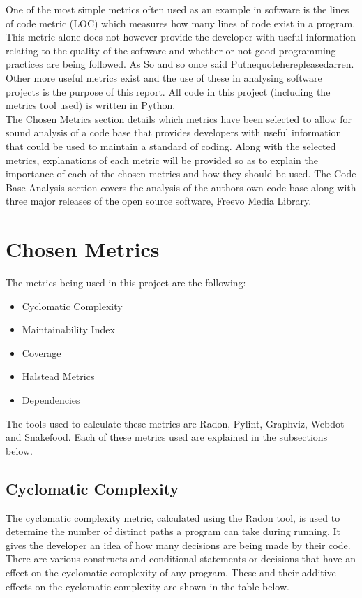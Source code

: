 \documentclass[11pt,journal, a4paper]{IEEEtran}
\begin{document}
\noindent
One of the most simple metrics often used as an example in software is the lines of code metric (LOC) which measures how many lines of code exist in a program. This metric alone does not however provide the developer with useful information relating to the quality of the software and whether or not good programming practices are being followed. As So and so once said Puthequoteherepleasedarren. Other more useful metrics exist and the use of these in analysing software projects is the purpose of this report. All code in this project (including the metrics tool used) is written in Python.  \\

\noindent
The Chosen Metrics section details which metrics have been selected to allow for sound analysis of a code base that provides developers with useful information that could be used to maintain a standard of coding. Along with the selected metrics, explanations of each metric will be provided so as to explain the importance of each of the chosen metrics and how they should be used. The Code Base Analysis section covers the analysis of the authors own code base along with three major releases of the open source software, Freevo Media Library. 



\section{Chosen Metrics}
\noindent
The metrics being used in this project are the following:
\begin{itemize}
\item Cyclomatic Complexity
\item Maintainability Index
\item Coverage
\item Halstead Metrics
\item Dependencies
\end{itemize}
\noindent
The tools used to calculate these metrics are Radon, Pylint, Graphviz, Webdot and Snakefood. Each of these metrics used are explained in the subsections below.

\subsection{Cyclomatic Complexity}
\noindent
The cyclomatic complexity metric, calculated using the Radon tool, is used to determine the number of distinct paths a program can take during running. It gives the developer an idea of how many decisions are being made by their code. There are various constructs and conditional statements or decisions that have an effect on the cyclomatic complexity of any program. These and their additive  effects on the cyclomatic complexity are shown in the table below. 
\end{document}
